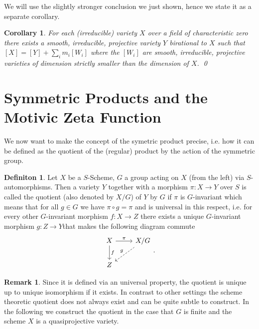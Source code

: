 \documentclass[11pt, a4paper, german]{article}
\theoremstyle{plain}
\newtheorem{corollary}[theorem]{Corollary}
\theoremstyle{definition}
\newtheorem{definition}[theorem]{Definiton}
\newtheorem{remark}[theorem]{Remark}
\begin{document}
We will use the slightly stronger conclusion we just shown, hence we state it as a separate corollary.

\begin{corollary}
    \label{decomp}
    For each (irreducible) variety $X$ over a field of characteristic zero there exists a smooth, irreducible, projective variety $Y$ birational
    to $X$ such that $[X] = [Y] + \sum_i m_i[W_i]$ where the $[W_i]$ are smooth, irreducible, projective varieties of dimension strictly
    smaller than the dimension of $X$. \qed
\end{corollary}




\section{Symmetric Products and the Motivic Zeta Function}
\label{symProd}
We now want to make the concept of the symetric product precise, i.e. how it can be defined as the quotient of the (regular) product by the
action of the symmetric group.

\begin{definition}
    Let $X$ be a $S$-Scheme, $G$ a group acting on $X$ (from the left) 
    via $S$-automorphisms. Then a variety $Y$ together with a morphism $\pi \colon X \to Y$
    over $S$ is called the quotient (also denoted by $X/G$) of $Y$ by $G$ if $\pi$ is $G$-invariant which means that for all $g \in G$ we have
    $\pi \circ g = \pi$ and is universal in this respect, i.e. for every other $G$-invariant morphism $f \colon X \to Z$ there exists a unique
    $G$-invariant morphism $g \colon Z \to Y$that makes the following diagram commute
    \begin{equation*}
        \begin{tikzcd}
            X \arrow{r}{\pi} \arrow{d}{f} & X/G \\
            Z \arrow[dashleftarrow]{ur}{g}
        \end{tikzcd}.
    \end{equation*}
\end{definition}

\begin{remark}
    Since it is defined via an universal property, the quotient is unique up to unique isomorphism if it exists. 
    In contrast to other settings the scheme theoretic quotient does not always exist and can be quite subtle to construct.
    In the following we construct the quotient in the case that $G$ is finite and the scheme $X$ is a quasiprojective variety.
\end{remark}
\end{document}
